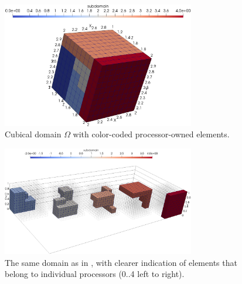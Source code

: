 \begin{figure}[H]
		\begin{center}
			\includegraphics[width=0.75\textwidth]{img/mesh/cube.jpg}
			\vspace{-2mm}
		\caption{Cubical domain $\Omega$ with color-coded processor-owned elements.}
		\label{figure:domainDecomposition}
		\end{center}
	\end{figure}\vspace{-5mm}
	
\begin{figure}[H]
		\begin{center}
			\includegraphics[width=0.75\textwidth]{img/mesh/cubeSub.jpg}
			\vspace{-2mm}
		\caption{The same domain as in , with clearer indication of elements that belong to individual processors (0..4 left to right).}
		\label{figure:domainDecomposition2}
		\end{center}
	\end{figure}\vspace{-5mm}
	

